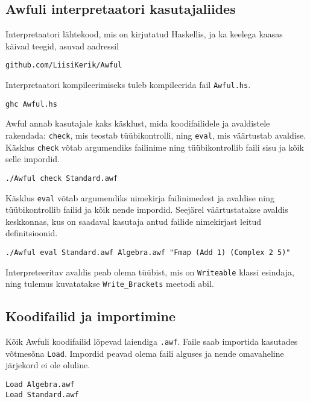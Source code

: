 \documentclass[12pt]{article}
\begin{document}
    \subsection{Awfuli interpretaatori kasutajaliides}
      Interpretaatori lähtekood, mis on kirjutatud Haskellis, ja ka keelega kaasas käivad teegid, asuvad aadressil

      \begin{verbatim}github.com/LiisiKerik/Awful\end{verbatim}

      Interpretaatori kompileerimiseks tuleb kompileerida fail \verb!Awful.hs!.

      \begin{verbatim}ghc Awful.hs\end{verbatim}

      Awful annab kasutajale kaks käsklust, mida koodifailidele ja avaldistele rakendada: \verb!check!, mis teostab tüübikontrolli, ning \verb!eval!, mis väärtustab avaldise. Käsklus \verb!check! võtab argumendiks failinime ning tüübikontrollib faili sisu ja kõik selle impordid.

      \begin{verbatim}./Awful check Standard.awf\end{verbatim}

      Käsklus \verb!eval! võtab argumendiks nimekirja failinimedest ja avaldise ning tüübikontrollib failid ja kõik nende impordid. Seejärel väärtustatakse avaldis keskkonnas, kus on saadaval kasutaja antud failide nimekirjast leitud definitsioonid.

      \begin{verbatim}./Awful eval Standard.awf Algebra.awf "Fmap (Add 1) (Complex 2 5)"\end{verbatim}

      Interpreteeritav avaldis peab olema tüübist, mis on \verb!Writeable! klassi esindaja, ning tulemus kuvatatakse \verb!Write_Brackets! meetodi abil.
    \subsection{Koodifailid ja importimine}
      Kõik Awfuli koodifailid lõpevad laiendiga \verb!.awf!. Faile saab importida kasutades võtmesõna \verb!Load!. Impordid peavad olema faili alguses ja nende omavaheline järjekord ei ole oluline.

      \begin{verbatim}Load Algebra.awf
Load Standard.awf\end{verbatim}
\end{document}
